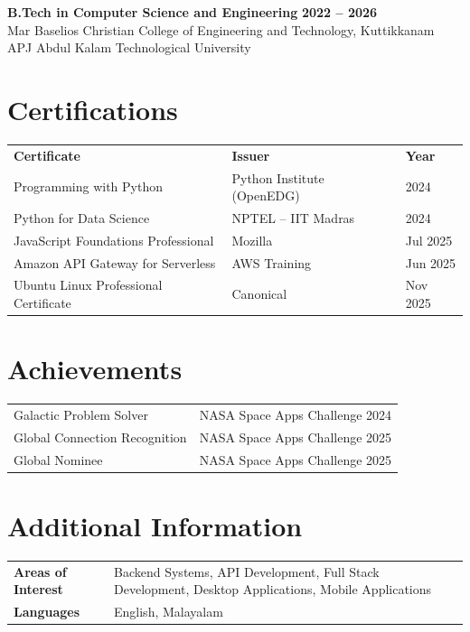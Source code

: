 \documentclass[10pt, a4paper]{article}
\begin{document}
\textbf{B.Tech in Computer Science and Engineering} \hfill \textbf{2022 -- 2026}\\
Mar Baselios Christian College of Engineering and Technology, Kuttikkanam \hfill APJ Abdul Kalam Technological University

\section*{Certifications}

\renewcommand{\arraystretch}{1.1}
\begin{tabular}{@{} p{7.8cm} p{6.5cm} p{2.5cm} @{}}
\textbf{Certificate}                  & \textbf{Issuer}              & \textbf{Year} \\[1pt]
Programming with Python               & Python Institute (OpenEDG)   & 2024 \\
Python for Data Science               & NPTEL -- IIT Madras          & 2024 \\
JavaScript Foundations Professional   & Mozilla                      & Jul 2025 \\
Amazon API Gateway for Serverless     & AWS Training                 & Jun 2025 \\
Ubuntu Linux Professional Certificate & Canonical                    & Nov 2025 \\
\end{tabular}

\section*{Achievements}

\begin{tabular}{@{} p{9.5cm} p{8cm} @{}}
Galactic Problem Solver              & NASA Space Apps Challenge 2024 \\
Global Connection Recognition        & NASA Space Apps Challenge 2025 \\
Global Nominee                       & NASA Space Apps Challenge 2025 \\
\end{tabular}

\section*{Additional Information}

\begin{tabular}{@{} >{\bfseries}p{3.8cm} p{13cm} @{}}
Areas of Interest & Backend Systems, API Development, Full Stack Development, Desktop Applications, Mobile Applications \\
Languages         & English, Malayalam \\
\end{tabular}
\end{document}
